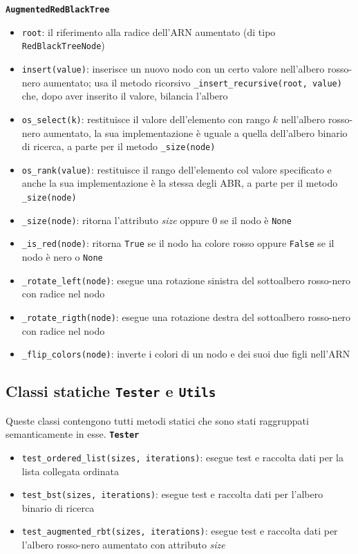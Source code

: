 \documentclass[onecolumn]{article}
\begin{document}
\newpage
{\setlength{\parindent}{0em} \texttt{\textbf{AugmentedRedBlackTree}}}
\begin{itemize}
	\setlength\itemsep{0em}
	\item \verb|root|: il riferimento alla radice dell'ARN aumentato (di tipo \texttt{RedBlackTreeNode})
	\item \verb|insert(value)|: inserisce un nuovo nodo con un certo valore nell'albero rosso-nero aumentato; usa il metodo ricorsivo \texttt{\_insert\_recursive(root, value)} che, dopo aver inserito il valore, bilancia l'albero
	\item \verb|os_select(k)|: restituisce il valore dell'elemento con rango $k$ nell'albero rosso-nero aumentato, la sua implementazione è uguale a quella dell'albero binario di ricerca, a parte per il metodo \texttt{\_size(node)}
	\item \verb|os_rank(value)|: restituisce il rango dell'elemento col valore specificato e anche la sua implementazione è la stessa degli ABR, a parte per il metodo \texttt{\_size(node)}
	\item \verb|_size(node)|: ritorna l'attributo \textit{size} oppure 0 se il nodo è \texttt{None}
	\item \verb|_is_red(node)|: ritorna \texttt{True} se il nodo ha colore rosso oppure \texttt{False} se il nodo è nero o \texttt{None}
	\item \verb|_rotate_left(node)|: esegue una rotazione sinistra del sottoalbero rosso-nero con radice nel nodo
	\item \verb|_rotate_rigth(node)|: esegue una rotazione destra del sottoalbero rosso-nero con radice nel nodo
	\item \verb|_flip_colors(node)|: inverte i colori di un nodo e dei suoi due figli nell'ARN
\end{itemize}

\subsection{Classi statiche \texttt{Tester} e \texttt{Utils}}

Queste classi contengono tutti metodi statici che sono stati raggruppati semanticamente in esse.
\vspace{0.75em}
\newline
\texttt{\textbf{Tester}}
\begin{itemize}
	\setlength\itemsep{0em}
	\item \verb|test_ordered_list(sizes, iterations)|: esegue test e raccolta dati per la lista collegata ordinata
	\item \verb|test_bst(sizes, iterations)|: esegue test e raccolta dati per l'albero binario di ricerca
	\item \verb|test_augmented_rbt(sizes, iterations)|: esegue test e raccolta dati per l'albero rosso-nero aumentato con attributo \textit{size}
\end{itemize}
\end{document}
